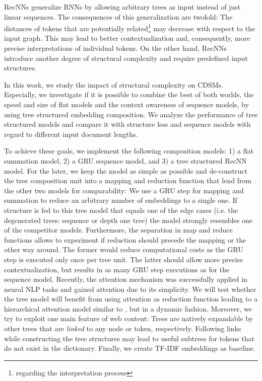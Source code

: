 \acp{RecNN} \autocite{goller_learning_1996,socher_parsing_2011} generalize \acp{RNN} by allowing arbitrary trees as input instead of just linear sequences. The consequences of this generalization are twofold: The distances of tokens that are potentially related\footnote{regarding the interpretation process} may decrease with respect to the input graph. This may lead to better  contextualization and, consequently, more precise interpretations of individual tokens. On the other hand, \acp{RecNN} introduce another degree of structural complexity and require predefined  input structures. 

In this work, we study the impact of structural complexity on \acp{CDSM}. Especially, we investigate if it is possible to combine the best of both worlds, the speed and size of flat models and the context awareness of sequence models, by using tree structured embedding composition. We analyze the performance of tree structured models and compare it with structure less and sequence models with regard to different input document lengths.


To achieve these goals, we implement the following composition models: 1) a flat summation model, 2) a \ac{GRU} \autocite{cho_properties_2014} sequence model, and 3) a tree structured \ac{RecNN} model. For the later, we keep the model as simple as possible and de-construct  the tree composition unit into a mapping and reduction function that lend from the other two models for comparability: We use a \ac{GRU} step for mapping and summation to reduce an arbitrary number of embeddings to a single one. If structure is fed to this tree model that equals one of the edge cases (i.e. the degenerated trees: sequence or depth one tree) the model strongly resembles one of the competitor models. Furthermore, the separation in map and reduce functions allows to experiment if reduction should precede the mapping or the other way around. The former would reduce computational costs as the \ac{GRU} step is executed only once per tree unit. The latter should allow more precise contextualization, but results in as many \ac{GRU} step executions as for the sequence model. Recently, the attention mechanism \autocite{bahdanau_neural_2014,xu_show_2015} was successfully applied in neural \ac{NLP} tasks \autocite{zhuang_neobility_2017,vaswani_attention_2017} and gained attention due to its simplicity. We will test whether the tree model will benefit from using attention as reduction function leading to a hierarchical attention model similar to \textcite{yang_hierarchical_2016}, but in a dynamic fashion. Moreover, we try to exploit one main feature of web content: Trees are natively expandable by other trees that are \textit{linked} to any node or token, respectively. Following links while constructing the tree structures may lead to useful subtrees for tokens that do not exist in the dictionary. Finally, we create \ac{TF-IDF} embeddings as baseline. 

